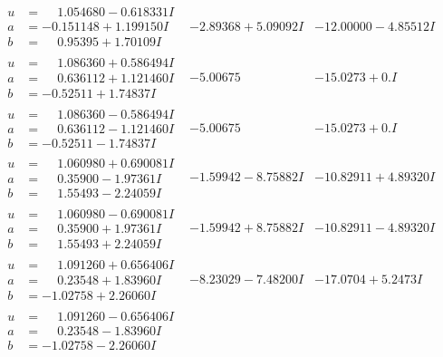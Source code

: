 \documentclass[1p]{elsarticle_modified}
\theoremstyle{definition}
\begin{document}
$$\begin{array}{c|c|c}
\begin{aligned}
u &= \phantom{-}1.054680 - 0.618331 I \\
a &= -0.151148 + 1.199150 I \\
b &= \phantom{-}0.95395 + 1.70109 I\end{aligned}
 & -2.89368 + 5.09092 I & -12.00000 - 4.85512 I \\ \hline\begin{aligned}
u &= \phantom{-}1.086360 + 0.586494 I \\
a &= \phantom{-}0.636112 + 1.121460 I \\
b &= -0.52511 + 1.74837 I\end{aligned}
 & -5.00675\phantom{ +0.000000I} & -15.0273 + 0. I\phantom{ +0.000000I} \\ \hline\begin{aligned}
u &= \phantom{-}1.086360 - 0.586494 I \\
a &= \phantom{-}0.636112 - 1.121460 I \\
b &= -0.52511 - 1.74837 I\end{aligned}
 & -5.00675\phantom{ +0.000000I} & -15.0273 + 0. I\phantom{ +0.000000I} \\ \hline\begin{aligned}
u &= \phantom{-}1.060980 + 0.690081 I \\
a &= \phantom{-}0.35900 - 1.97361 I \\
b &= \phantom{-}1.55493 - 2.24059 I\end{aligned}
 & -1.59942 - 8.75882 I & -10.82911 + 4.89320 I \\ \hline\begin{aligned}
u &= \phantom{-}1.060980 - 0.690081 I \\
a &= \phantom{-}0.35900 + 1.97361 I \\
b &= \phantom{-}1.55493 + 2.24059 I\end{aligned}
 & -1.59942 + 8.75882 I & -10.82911 - 4.89320 I \\ \hline\begin{aligned}
u &= \phantom{-}1.091260 + 0.656406 I \\
a &= \phantom{-}0.23548 + 1.83960 I \\
b &= -1.02758 + 2.26060 I\end{aligned}
 & -8.23029 - 7.48200 I & -17.0704 + 5.2473 I \\ \hline\begin{aligned}
u &= \phantom{-}1.091260 - 0.656406 I \\
a &= \phantom{-}0.23548 - 1.83960 I \\
b &= -1.02758 - 2.26060 I\end{aligned}

\end{array}$$
\end{document}
